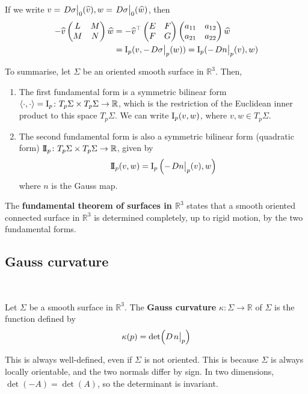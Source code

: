 \documentclass[a4paper,11pt]{article}
\begin{document}
If we write $ v = \teval{D\sigma}0 (\widehat{v}) ,w = \teval{D\sigma}0 (\widehat{w})$, then 
\begin{align*}
	- \widehat{v} \begin{pmatrix}
		L  &  M \\
		M &  N \\
	\end{pmatrix} \widehat{w} &= - \widehat{v}^\top \begin{pmatrix}
		E &  F \\
		F &  G \\
	\end{pmatrix} \begin{pmatrix}
		a_{11} &  a_{12} \\
		a_{21} &  a_{22} \\
	\end{pmatrix} \widehat{w}\\ 
	&= \Iff_p (v,-\teval{D\sigma}p (w) ) = \Iff_p(-\teval{Dn}p(v),w)
\end{align*}

To summarise, let \( \Sigma \) be an oriented smooth surface in \( \mathbb R^3 \).
Then,
\begin{enumerate}
	\item The first fundamental form is a symmetric bilinear form \( \left\langle{\cdot,\cdot}\right\rangle = \operatorname{\mathrm{I}}_p \colon T_p \Sigma \times T_p \Sigma \to \mathbb R \), which is the restriction of the Euclidean inner product to this space \( T_p \Sigma \).
			We can write \( \operatorname{\mathrm{I}}_p(v,w) \), where \( v, w \in T_p \Sigma \).
	\item The second fundamental form is also a symmetric bilinear form (quadratic form) \( \operatorname{\mathrm{I\!I}}_p \colon T_p \Sigma \times T_p \Sigma \to \mathbb R \), given by
			\[
				\IIff_p(v,w) = \Iff_p\qty(-\teval{Dn}{p}(v), w)
			\]
			where \( n \) is the Gauss map.
\end{enumerate}

\begin{remark}
	The \textbf{fundamental theorem of surfaces in \( \mathbb R^3 \)} states that a smooth oriented connected surface in \( \mathbb R^3 \) is determined completely, up to rigid motion, by the two fundamental forms.
\end{remark}

\subsection{Gauss curvature}
\ \vspace*{-1.5em}
\begin{definition}
	Let \( \Sigma \) be a smooth surface in \( \mathbb R^3 \).
	The \textbf{Gauss curvature} \( \kappa \colon \Sigma \to \mathbb R \) of \( \Sigma \) is the function defined by
	\[
		\kappa(p) = \det(D \teval{n}p)
	\]
\end{definition}
\begin{remark}
	This is always well-defined, even if \( \Sigma \) is not oriented.
	This is because \( \Sigma \) is always locally orientable, and the two normals differ by sign.
	In two dimensions, \( \det(-A) = \det(A) \), so the determinant is invariant.
\end{remark}
\end{document}
